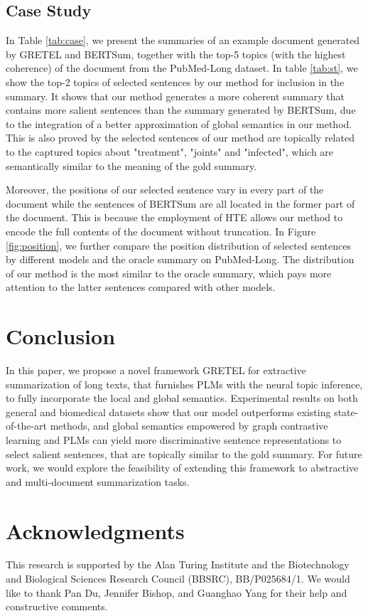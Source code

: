 \documentclass[11pt]{article}
\begin{document}
\subsection{Case Study}
In Table \ref{tab:case}, we present the summaries of an example document generated by GRETEL and BERTSum, together with the top-5 topics (with the highest coherence) of the document from the PubMed-Long dataset.
In table \ref{tab:st}, we show the top-2 topics of selected sentences by our method for inclusion in the summary.
It shows that our method generates a more coherent summary that contains more salient sentences than the summary generated by BERTSum, due to the integration of a better approximation of global semantics in our method.
This is also proved by the selected sentences of our method are topically related to the captured topics about "treatment", "joints" and "infected", which are semantically similar to the meaning of the gold summary.

Moreover, the positions of our selected sentence vary in every part of the document while the sentences of BERTSum are all located in the former part of the document.
This is because the employment of HTE allows our method to encode the full contents of the document without truncation.
In Figure \ref{fig:position}, we further compare the position distribution of selected sentences by different models and the oracle summary on PubMed-Long.
The distribution of our method is the most similar to the oracle summary, which pays more attention to the latter sentences compared with other models.
\section{Conclusion}
In this paper, we propose a novel framework GRETEL for extractive summarization of long texts, that furnishes PLMs with the neural topic inference, to fully incorporate the local and global semantics.
Experimental results on both general and biomedical datasets show that our model outperforms existing state-of-the-art methods, and global semantics empowered by graph contrastive learning and PLMs can yield more discriminative sentence representations to select salient sentences, that are topically similar to the gold summary. For future work, we would explore the feasibility of extending this framework to abstractive and multi-document summarization tasks.
\section*{Acknowledgments}
This research is supported by the Alan Turing Institute and the Biotechnology and Biological Sciences Research Council (BBSRC), BB/P025684/1. 
We would like to thank Pan Du, Jennifer Bishop, and Guanghao Yang for their help and constructive comments.


\end{document}
